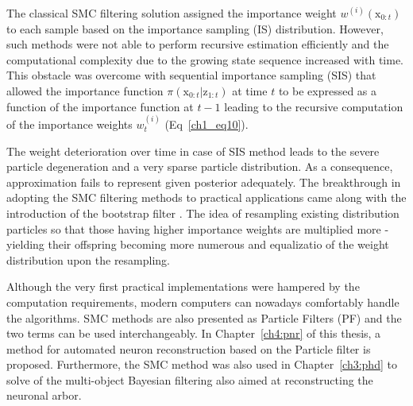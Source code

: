 The classical SMC filtering solution assigned the importance weight $w^{(i)}(\mathrm{x}_{0:t})$ to each sample based on the importance sampling (IS) distribution. However, such methods were not able to perform recursive estimation efficiently and the computational complexity due to the growing state sequence increased with time. This obstacle was overcome with sequential importance sampling (SIS) that allowed the importance function $\pi(\mathrm{x}_{0:t} | \mathrm{z}_{1:t})$ at time $t$ to be expressed as a function of the importance function at $t-1$ leading to the recursive computation of the importance weights $w_{t}^{(i)}$ (Eq~\ref{ch1_eq10}).

The weight deterioration over time in case of SIS method leads to the severe particle degeneration and a very sparse particle distribution. As a consequence, approximation fails to represent given posterior adequately. The breakthrough in adopting the SMC filtering methods to practical applications came along with the introduction of the bootstrap filter \cite{gordon1993novel}. The idea of resampling existing distribution particles so that those having higher importance weights are multiplied more - yielding their offspring becoming more numerous and equalizatio of the weight distribution upon the resampling.

Although the very first practical implementations were hampered by the computation requirements, modern computers can nowadays comfortably handle the algorithms. SMC methods are also presented as Particle Filters (PF) and the two terms can be used interchangeably. In Chapter~\ref{ch4:pnr} of this thesis, a method for automated neuron reconstruction based on the Particle filter is proposed. Furthermore, the SMC method was also used in Chapter~\ref{ch3:phd} to solve of the multi-object Bayesian filtering also aimed at reconstructing the neuronal arbor. 


